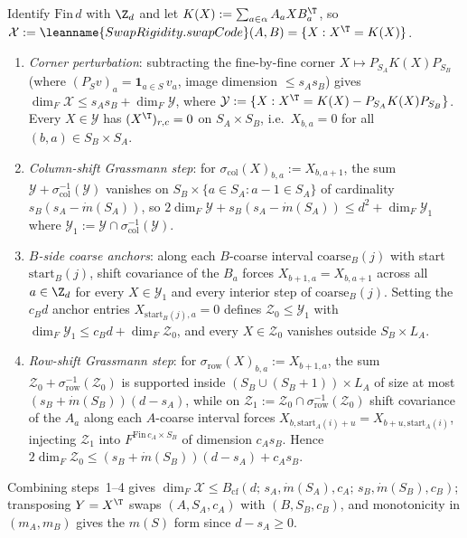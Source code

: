 \begin{outline}
Identify $\mathrm{Fin}\,d$ with $\Z_d$ and let $K(X) := \sum_{a \in \alpha} A_a X B_a^{\T}$, so
$\mathcal{X} := \leanname{SwapRigidity.swapCode}(A, B) = \{X : X^{\T} = K(X)\}$.
\begin{enumerate}[label=\arabic*.,leftmargin=1.5em]
\item \emph{Corner perturbation}: subtracting the fine-by-fine corner $X \mapsto P_{S_A} K(X) P_{S_B}$
  (where $(P_S v)_a = \mathbf{1}_{a \in S}\,v_a$, image dimension $\le s_A s_B$) gives
  $\dim_F \mathcal{X} \le s_A s_B + \dim_F \mathcal{Y}$, where
  $\mathcal{Y} := \{X : X^{\T} = K(X) - P_{S_A} K(X) P_{S_B}\}$. Every $X \in \mathcal{Y}$ has
  $(X^{\T})_{r,c} = 0$ on $S_A \times S_B$, i.e.\ $X_{b,a} = 0$ for all $(b,a) \in S_B \times S_A$.
\item \emph{Column-shift Grassmann step}: for $\sigma_{\mathrm{col}}(X)_{b,a} := X_{b, a+1}$, the sum
  $\mathcal{Y} + \sigma_{\mathrm{col}}^{-1}(\mathcal{Y})$ vanishes on
  $S_B \times \{a \in S_A : a - 1 \in S_A\}$ of cardinality $s_B(s_A - \dot{m}(S_A))$, so
  $2\dim_F \mathcal{Y} + s_B(s_A - \dot{m}(S_A)) \le d^2 + \dim_F \mathcal{Y}_1$ where
  $\mathcal{Y}_1 := \mathcal{Y} \cap \sigma_{\mathrm{col}}^{-1}(\mathcal{Y})$.
\item \emph{$B$-side coarse anchors}: along each $B$-coarse interval $\mathrm{coarse}_B(j)$ with start
  $\mathrm{start}_B(j)$, shift covariance of the $B_a$ forces $X_{b+1, a} = X_{b, a+1}$ across all
  $a \in \Z_d$ for every $X \in \mathcal{Y}_1$ and every interior step of $\mathrm{coarse}_B(j)$.
  Setting the $c_B d$ anchor entries $X_{\mathrm{start}_B(j), a} = 0$ defines $\mathcal{Z}_0 \le
  \mathcal{Y}_1$ with $\dim_F \mathcal{Y}_1 \le c_B d + \dim_F \mathcal{Z}_0$, and every
  $X \in \mathcal{Z}_0$ vanishes outside $S_B \times L_A$.
\item \emph{Row-shift Grassmann step}: for $\sigma_{\mathrm{row}}(X)_{b,a} := X_{b+1, a}$, the sum
  $\mathcal{Z}_0 + \sigma_{\mathrm{row}}^{-1}(\mathcal{Z}_0)$ is supported inside
  $(S_B \cup (S_B + 1)) \times L_A$ of size at most $(s_B + \dot{m}(S_B))(d - s_A)$, while on
  $\mathcal{Z}_1 := \mathcal{Z}_0 \cap \sigma_{\mathrm{row}}^{-1}(\mathcal{Z}_0)$ shift covariance of
  the $A_a$ along each $A$-coarse interval forces $X_{b, \mathrm{start}_A(i) + u} =
  X_{b + u, \mathrm{start}_A(i)}$, injecting $\mathcal{Z}_1$ into $F^{\mathrm{Fin}\,c_A \times S_B}$ of
  dimension $c_A s_B$. Hence $2\dim_F \mathcal{Z}_0 \le (s_B + \dot{m}(S_B))(d - s_A) + c_A s_B$.
\end{enumerate}
Combining steps~1--4 gives $\dim_F \mathcal{X} \le B_{\mathrm{cf}}(d;\, s_A, \dot{m}(S_A), c_A;\,
s_B, \dot{m}(S_B), c_B)$; transposing $Y = X^{\T}$ swaps $(A, S_A, c_A)$ with $(B, S_B, c_B)$, and
monotonicity in $(m_A, m_B)$ gives the $m(S)$ form since $d - s_A \ge 0$.
\end{outline}


